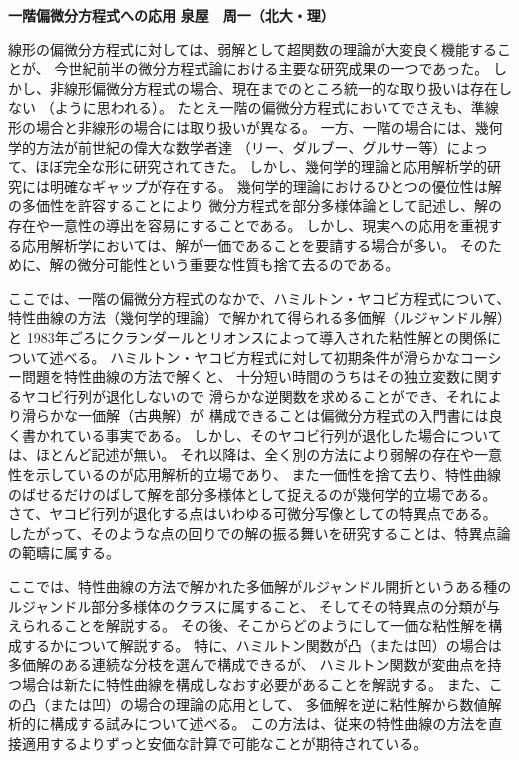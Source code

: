 \documentclass[uplatex,dvipdfmx]{jlreq}
\begin{document}
\noindent
{\large\bfseries 一階偏微分方程式への応用}
\hfill
{\large\bfseries 泉屋　周一（北大・理）}

\medskip

線形の偏微分方程式に対しては、弱解として超関数の理論が大変良く機能することが、
今世紀前半の微分方程式論における主要な研究成果の一つであった。
しかし、非線形偏微分方程式の場合、現在までのところ統一的な取り扱いは存在しない
（ように思われる）。
たとえ一階の偏微分方程式においてでさえも、準線形の場合と非線形の場合には取り扱いが異なる。
一方、一階の場合には、幾何学的方法が前世紀の偉大な数学者達
（リー、ダルブー、グルサー等）によって、ほぼ完全な形に研究されてきた。
しかし、幾何学的理論と応用解析学的研究には明確なギャップが存在する。
幾何学的理論におけるひとつの優位性は解の多価性を許容することにより
微分方程式を部分多様体論として記述し、解の存在や一意性の導出を容易にすることである。
しかし、現実への応用を重視する応用解析学においては、解が一価であることを要請する場合が多い。
そのために、解の微分可能性という重要な性質も捨て去るのである。

ここでは、一階の偏微分方程式のなかで、ハミルトン・ヤコビ方程式について、
特性曲線の方法（幾何学的理論）で解かれて得られる多価解（ルジャンドル解）と
1983年ごろにクランダールとリオンスによって導入された粘性解との関係について述べる。
ハミルトン・ヤコビ方程式に対して初期条件が滑らかなコーシー問題を特性曲線の方法で解くと、
十分短い時間のうちはその独立変数に関するヤコビ行列が退化しないので
滑らかな逆関数を求めることができ、それにより滑らかな一価解（古典解）が
構成できることは偏微分方程式の入門書には良く書かれている事実である。
しかし、そのヤコビ行列が退化した場合については、ほとんど記述が無い。
それ以降は、全く別の方法により弱解の存在や一意性を示しているのが応用解析的立場であり、
また一価性を捨て去り、特性曲線のばせるだけのばして解を部分多様体として捉えるのが幾何学的立場である。
さて、ヤコビ行列が退化する点はいわゆる可微分写像としての特異点である。
したがって、そのような点の回りでの解の振る舞いを研究することは、特異点論の範疇に属する。

ここでは、特性曲線の方法で解かれた多価解がルジャンドル開折というある種の
ルジャンドル部分多様体のクラスに属すること、
そしてその特異点の分類が与えられることを解説する。
その後、そこからどのようにして一価な粘性解を構成するかについて解説する。
特に、ハミルトン関数が凸（または凹）の場合は多価解のある連続な分枝を選んで構成できるが、
ハミルトン関数が変曲点を持つ場合は新たに特性曲線を構成しなおす必要があることを解説する。
また、この凸（または凹）の場合の理論の応用として、
多価解を逆に粘性解から数値解析的に構成する試みについて述べる。
この方法は、従来の特性曲線の方法を直接適用するよりずっと安価な計算で可能なことが期待されている。
\end{document}

